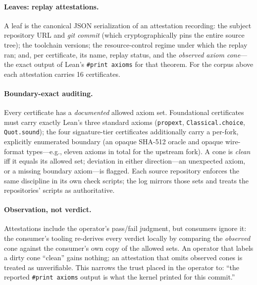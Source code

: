 \documentclass[10pt,twocolumn]{article}
\newcommand{\code}[1]{\texttt{\small #1}}
\begin{document}
\paragraph{Leaves: replay attestations.} A leaf is the canonical JSON
serialization of an attestation recording: the subject repository URL
and \emph{git commit} (which cryptographically pins the entire source
tree); the toolchain versions; the resource-control regime under which
the replay ran; and, per certificate, its name, replay status, and the
\emph{observed axiom cone}---the exact output of Lean's
\code{\#print axioms} for that theorem. For the corpus above each
attestation carries 16 certificates.

\paragraph{Boundary-exact auditing.} Every certificate has a
\emph{documented} allowed axiom set. Foundational certificates must
carry exactly Lean's three standard axioms
(\code{propext}, \code{Classical.choice}, \code{Quot.sound}); the four
signature-tier certificates additionally carry a per-fork, explicitly
enumerated boundary (an opaque SHA-512 oracle and opaque wire-format
types---e.g., eleven axioms in total for the upstream fork). A cone is
\emph{clean} iff it equals its allowed set; deviation in either
direction---an unexpected axiom, or a missing boundary axiom---is
flagged. Each source repository enforces the same discipline in its own
check scripts; the log mirrors those sets and treats the repositories'
scripts as authoritative.

\paragraph{Observation, not verdict.} Attestations include the
operator's pass/fail judgment, but consumers ignore it: the consumer's
tooling re-derives every verdict locally by comparing the
\emph{observed} cone against the consumer's own copy of the allowed
sets. An operator that labels a dirty cone ``clean'' gains nothing; an
attestation that omits observed cones is treated as unverifiable. This
narrows the trust placed in the operator to: ``the reported
\code{\#print axioms} output is what the kernel printed for this commit.''
\end{document}
